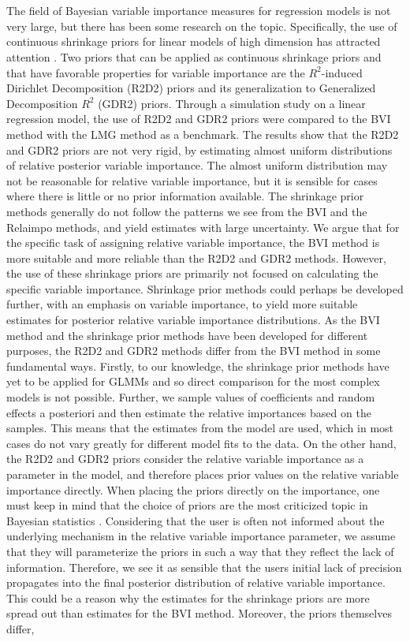 \\
\\
The field of Bayesian variable importance measures for regression models is not very large, but there has been some research on the topic. Specifically, the use of continuous shrinkage priors for linear models of high dimension has attracted attention \citep{aguilar2024generalized}. Two priors that can be applied as continuous shrinkage priors and that have favorable properties for variable importance are the $R^2$-induced Dirichlet Decomposition (R2D2) priors \citep{zhang2020bayesian} and its generalization to Generalized Decomposition $R^2$ (GDR2) priors. Through a simulation study on a linear regression model, the use of R2D2 and GDR2 priors were compared to the BVI method with the LMG method as a benchmark. The results show that the R2D2 and GDR2 priors are not very rigid, by estimating almost uniform distributions of relative posterior variable importance. The almost uniform distribution may not be reasonable for relative variable importance, but it is sensible for cases where there is little or no prior information available. The shrinkage prior methods generally do not follow the patterns we see from the BVI and the Relaimpo methods, and yield estimates with large uncertainty. We argue that for the specific task of assigning relative variable importance, the BVI method is more suitable and more reliable than the R2D2 and GDR2 methods. However, the use of these shrinkage priors are primarily not focused on calculating the specific variable importance. Shrinkage prior methods could perhaps be developed further, with an emphasis on variable importance, to yield more suitable estimates for posterior relative variable importance distributions. As the BVI method and the shrinkage prior methods have been developed for different purposes, the R2D2 and GDR2 methods differ from the BVI method in some fundamental ways. Firstly, to our knowledge, the shrinkage prior methods have yet to be applied for GLMMs and so direct comparison for the most complex models is not possible. Further, we sample values of coefficients and random effects a posteriori and then estimate the relative importances based on the samples. This means that the estimates from the model are used, which in most cases do not vary greatly for different model fits to the data. On the other hand, the R2D2 and GDR2 priors consider the relative variable importance as a parameter in the model, and therefore places prior values on the relative variable importance directly. When placing the priors directly on the importance, one must keep in mind that the choice of priors are the most criticized topic in Bayesian statistics \citep{robert2007bayesian}. Considering that the user is often not informed about the underlying mechanism in the relative variable importance parameter, we assume that they will parameterize the priors in such a way that they reflect the lack of information. Therefore, we see it as sensible that the users initial lack of precision propagates into the final posterior distribution of relative variable importance. This could be a reason why the estimates for the shrinkage priors are more spread out than estimates for the BVI method. Moreover, the priors themselves differ, 